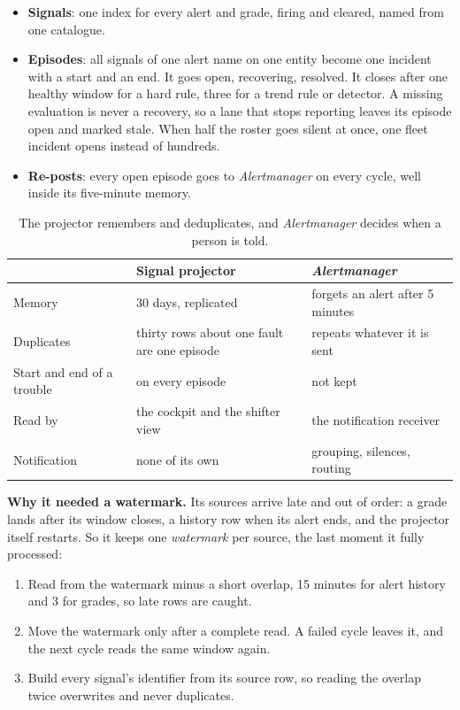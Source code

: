 \begin{itemize}
\item \textbf{Signals}: one index for every alert and grade, firing and cleared, named from one catalogue.
\item \textbf{Episodes}: all signals of one alert name on one entity become one incident with a start and an end. It goes open, recovering, resolved. It closes after one healthy window for a hard rule, three for a trend rule or detector. A missing evaluation is never a recovery, so a lane that stops reporting leaves its episode open and marked stale. When half the roster goes silent at once, one fleet incident opens instead of hundreds.
\item \textbf{Re-posts}: every open episode goes to \textit{Alertmanager} on every cycle, well inside its five-minute memory.
\end{itemize}

\begin{table}[htbp]\caption{The projector remembers and deduplicates, and \textit{Alertmanager} decides when a person is told.}\label{tab:projector}\centering\footnotesize
\begin{tabularx}{\textwidth}{L{0.24\textwidth} Y Y}
\toprule
 & Signal projector & \textit{Alertmanager} \\
\midrule
Memory & 30 days, replicated & forgets an alert after 5 minutes \\
Duplicates & thirty rows about one fault are one episode & repeats whatever it is sent \\
Start and end of a trouble & on every episode & not kept \\
Read by & the cockpit and the shifter view & the notification receiver \\
Notification & none of its own & grouping, silences, routing \\
\bottomrule
\end{tabularx}
\end{table}

\textbf{Why it needed a watermark.} Its sources arrive late and out of order: a grade lands after its window closes, a history row when its alert ends, and the projector itself restarts. So it keeps one \emph{watermark} per source, the last moment it fully processed:

\begin{enumerate}
\item Read from the watermark minus a short overlap, 15 minutes for alert history and 3 for grades, so late rows are caught.
\item Move the watermark only after a complete read. A failed cycle leaves it, and the next cycle reads the same window again.
\item Build every signal's identifier from its source row, so reading the overlap twice overwrites and never duplicates.
\end{enumerate}

